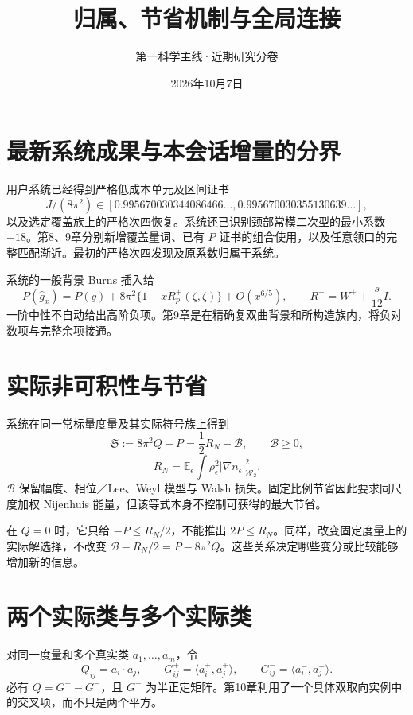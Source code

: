 \documentclass[UTF8,11pt,fontset=none]{ctexart}
\title{归属、节省机制与全局连接}
\author{第一科学主线·近期研究分卷}
\date{2026年10月7日}
\begin{document}
\maketitle
\section{最新系统成果与本会话增量的分界}\label{ch11:ux6700ux65b0ux7cfbux7edfux6210ux679cux4e0eux672cux4f1aux8bddux589eux91cfux7684ux5206ux754c}

用户系统已经得到严格低成本单元及区间证书 \[
J/(8\pi^2)\in[0.995670030344086466\ldots,
0.995670030355130639\ldots],
\] 以及选定覆盖族上的严格次四恢复。系统还已识别颈部常模二次型的最小系数 \(-18\)。第8、9章分别新增覆盖量词、已有 \(P\) 证书的组合使用，以及任意领口的完整匹配渐近。最初的严格次四发现及原系数归属于系统。\cite{System,CellSource,R08,R09}

系统的一般背景 Burns 插入给 \[
P(\hat g_x)=P(g)+8\pi^2\{1-xR_p^+(\zeta,\zeta)\}+O(x^{6/5}),
\qquad R^+=W^++\frac{s}{12}I.
\] 一阶中性不自动给出高阶负项。第9章是在精确复双曲背景和所构造族内，将负对数项与完整余项接通。

\section{实际非可积性与节省}\label{ch11:ux5b9eux9645ux975eux53efux79efux6027ux4e0eux8282ux7701}

系统在同一常标量度量及其实际符号族上得到 \[
\mathfrak S:=8\pi^2Q-P=\frac12R_N-\mathcal B,
\qquad\mathcal B\ge0,
\] \[
R_N=\mathbb E_\epsilon\int\rho_\epsilon^2
|\nabla n_\epsilon|_{\mathcal W_2}^2.
\] \(\mathcal B\) 保留幅度、相位／Lee、Weyl 模型与 Walsh 损失。固定比例节省因此要求同尺度加权 Nijenhuis 能量，但该等式本身不控制可获得的最大节省。\cite{Field,System}

在 \(Q=0\) 时，它只给 \(-P\le R_N/2\)，不能推出 \(2P\le R_N\)。同样，改变固定度量上的实际解选择，不改变 \(\mathcal B-R_N/2=P-8\pi^2Q\)。这些关系决定哪些变分或比较能够增加新的信息。

\section{两个实际类与多个实际类}\label{ch11:ux4e24ux4e2aux5b9eux9645ux7c7bux4e0eux591aux4e2aux5b9eux9645ux7c7b}

对同一度量和多个真实类 \(a_1,\ldots,a_m\)，令 \[
Q_{ij}=a_i\cdot a_j,\qquad
G_{ij}^+=\langle a_i^+,a_j^+\rangle,
\qquad G_{ij}^-=\langle a_i^-,a_j^-\rangle.
\] 必有 \(Q=G^+-G^-\)，且 \(G^\pm\) 为半正定矩阵。第10章利用了一个具体双取向实例中的交叉项，而不只是两个平方。
\end{document}
